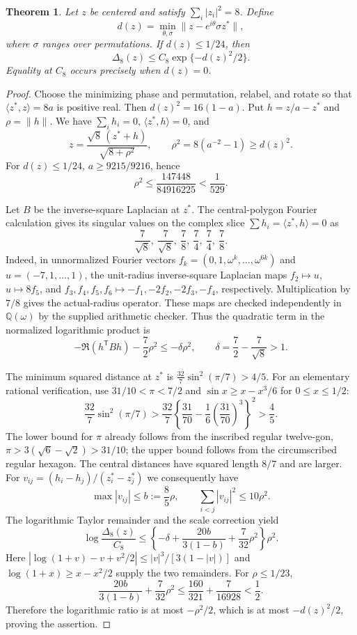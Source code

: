 \documentclass[11pt]{article}
\newtheorem{theorem}{Theorem}[section]
\theoremstyle{remark}
\numberwithin{equation}{section}
\begin{document}
\begin{theorem}\label{thm:n8-full-neighborhood}
Let $z$ be centered and satisfy $\sum_i|z_i|^2=8$. Define
\[
 d(z)=\min_{\theta,\sigma}
       \|z-e^{i\theta}\sigma z^*\|,
\]
where $\sigma$ ranges over permutations. If $d(z)\le1/24$, then
\[
       \Delta_8(z)\le C_8\exp\{-d(z)^2/2\}.
\]
Equality at $C_8$ occurs precisely when $d(z)=0$.
\end{theorem}
\begin{proof}
Choose the minimizing phase and permutation, relabel, and rotate
so that $\langle z^*,z\rangle=8a$ is positive real.
Then $d(z)^2=16(1-a)$. Put $h=z/a-z^*$ and $\rho=\|h\|$.
We have $\sum_i h_i=0$, $\langle z^*,h\rangle=0$, and
\[
 z=\frac{\sqrt8\,(z^*+h)}{\sqrt{8+\rho^2}},\qquad
 \rho^2=8(a^{-2}-1)\ge d(z)^2.
\]
For $d(z)\le1/24$, $a\ge9215/9216$, hence
\[
 \rho^2\le\frac{147448}{84916225}<\frac1{529}.
\]

Let $B$ be the inverse-square Laplacian at $z^*$. The central-polygon
Fourier calculation gives its singular values on the complex slice
$\sum h_i=\langle z^*,h\rangle=0$ as
\[
 \frac7{\sqrt8},\ \frac7{\sqrt8},\
 \frac78,\ \frac74,\ \frac74,\ \frac78.
\]
Indeed, in unnormalized Fourier vectors
$f_k=(0,1,\omega^k,\ldots,\omega^{6k})$ and
$u=(-7,1,\ldots,1)$, the unit-radius inverse-square Laplacian maps
$f_2\mapsto u$, $u\mapsto8f_5$, and
$f_3,f_4,f_5,f_6\mapsto-f_1,-2f_2,-2f_3,-f_4$,
respectively. Multiplication by $7/8$ gives the actual-radius
operator. These maps are checked independently in $\mathbb Q(\omega)$
by the supplied arithmetic checker.
Thus the quadratic term in the normalized logarithmic product is
\[
 -\Re(h^{\mathsf T}Bh)-\frac72\rho^2
 \le-\delta\rho^2,\qquad
 \delta=\frac72-\frac7{\sqrt8}>1.
\]

The minimum squared distance at $z^*$ is
$\frac{32}{7}\sin^2(\pi/7)>4/5$.
For an elementary rational verification, use $31/10<\pi<7/2$ and
$\sin x\ge x-x^3/6$ for $0\le x\le1/2$:
\[
 \frac{32}{7}\sin^2(\pi/7)
 >\frac{32}{7}\left\{\frac{31}{70}
              -\frac16\left(\frac{31}{70}\right)^3\right\}^2>\frac45.
\]
The lower bound for $\pi$ already follows from the inscribed
regular twelve-gon, $\pi>3(\sqrt6-\sqrt2)>31/10$;
the upper bound follows from the circumscribed regular hexagon.
The central distances have squared length $8/7$ and are larger.
For $v_{ij}=(h_i-h_j)/(z_i^*-z_j^*)$ we consequently have
\[
 \max|v_{ij}|\le b:=\frac85\rho,
 \qquad \sum_{i<j}|v_{ij}|^2\le10\rho^2.
\]
The logarithmic Taylor remainder and the scale correction yield
\[
 \log\frac{\Delta_8(z)}{C_8}
 \le\left\{-\delta+\frac{20b}{3(1-b)}
                   +\frac7{32}\rho^2\right\}\rho^2.
\]
Here $|\log(1+v)-v+v^2/2|\le |v|^3/[3(1-|v|)]$
and $\log(1+x)\ge x-x^2/2$ supply the two remainders.
For $\rho\le1/23$,
\[
 \frac{20b}{3(1-b)}+\frac7{32}\rho^2
 \le\frac{160}{321}+\frac7{16928}<\frac12.
\]
Therefore the logarithmic ratio is at most $-\rho^2/2$,
which is at most $-d(z)^2/2$, proving the assertion.
\end{proof}
\end{document}
